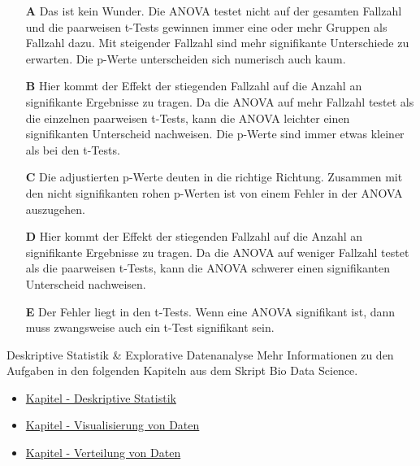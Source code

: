 \documentclass[a4paper, 9pt]{scrartcl}\usepackage[]{graphicx}\usepackage[]{xcolor}
\begin{document}
\begin{enumerate}
\item [\textbf{A} \msquare] Das ist kein Wunder. Die ANOVA testet nicht auf der gesamten Fallzahl und die paarweisen t-Tests gewinnen immer eine oder mehr Gruppen als Fallzahl dazu. Mit steigender Fallzahl sind mehr signifikante Unterschiede zu erwarten. Die p-Werte unterscheiden sich numerisch auch kaum.
\item [\textbf{B} \msquare] Hier kommt der Effekt der stiegenden Fallzahl auf die Anzahl an signifikante Ergebnisse zu tragen. Da die ANOVA auf mehr Fallzahl testet als die einzelnen paarweisen t-Tests, kann die ANOVA leichter einen signifikanten Unterscheid nachweisen. Die p-Werte sind immer etwas kleiner als bei den t-Tests.
\item [\textbf{C} \msquare] Die adjustierten p-Werte deuten in die richtige Richtung. Zusammen mit den nicht signifikanten rohen p-Werten ist von einem Fehler in der ANOVA auszugehen.
\item [\textbf{D} \msquare] Hier kommt der Effekt der stiegenden Fallzahl auf die Anzahl an signifikante Ergebnisse zu tragen. Da die ANOVA auf weniger Fallzahl testet als die paarweisen t-Tests, kann die ANOVA schwerer einen signifikanten Unterscheid nachweisen.
\item [\textbf{E} \msquare] Der Fehler liegt in den t-Tests. Wenn eine ANOVA signifikant ist, dann muss zwangsweise auch ein t-Test signifikant sein.
\end{enumerate}
    
\clearpage
\begin{graybox}{Deskriptive Statistik \& Explorative Datenanalyse}
Mehr Informationen zu den Aufgaben in den folgenden Kapiteln aus dem Skript Bio Data Science.
  \begin{itemize}
  \item \href{https://jkruppa.github.io/eda-descriptive.html}{Kapitel - Deskriptive Statistik}
  \item \href{https://jkruppa.github.io/eda-ggplot.html}{Kapitel - Visualisierung von Daten}
  \item \href{https://jkruppa.github.io/eda-distribution.html}{Kapitel - Verteilung von Daten}
  \end{itemize}
\end{graybox}
\clearpage
\end{document}
